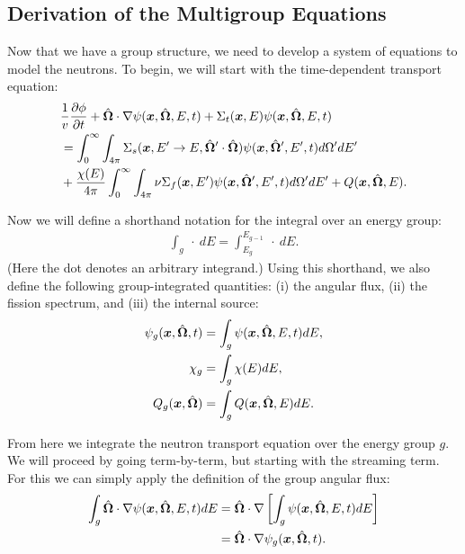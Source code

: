 \subsection{Derivation of the Multigroup Equations} \label{Sec:neutronics_multigroupEquationsDerivation}

Now that we have a group structure, we need to develop a system of equations to model the neutrons. To begin, we will start with the time-dependent transport equation:
\begin{align}
  &\frac{1}{v} \frac{ \partial {\phi} }{ \partial {t} } + \hat{\mathbf{\Omega}} \cdot \nabla\psi(\bm{x},\hat{\mathbf{\Omega}},E,t) + \Sigma_t(\bm{x},E) \psi(\bm{x},\hat{\mathbf{\Omega}},E,t) \nonumber \\*
  &= \int_0^\infty \int_{4\pi} \Sigma_s( \bm{x}, E' \rightarrow E, \hat{\mathbf{\Omega}}' \cdot \hat{\mathbf{\Omega}} ) \psi( \bm{x}, \hat{\mathbf{\Omega}}', E',t ) d\Omega' dE' \nonumber \\*
  &+ \frac{\chi(E)}{4\pi} \int_0^\infty \int_{4\pi} \nu \Sigma_f( \bm{x}, E') \psi( \bm{x}, \hat{\mathbf{\Omega}}', E',t ) d\Omega' dE' + Q(\bm{x},\hat{\mathbf{\Omega}},E).
\end{align}

Now we will define a shorthand notation for the integral over an energy group:
\begin{align}
  \int_g \ \cdot \ dE = \int_{E_g}^{E_{g-1}} \ \cdot \ dE .
\end{align}
(Here the dot denotes an arbitrary integrand.) Using this shorthand, we also define the following group-integrated quantities: (i) the angular flux, (ii) the fission spectrum, and (iii) the internal source:
\begin{subequations}
\begin{align}
  \psi_g(\bm{x},\hat{\mathbf{\Omega}},t) &= \int_g \psi(\bm{x},\hat{\mathbf{\Omega}},E,t) dE, \\
  \chi_g &= \int_g \chi(E) dE, \\
  Q_g(\bm{x},\hat{\mathbf{\Omega}}) &= \int_g Q(\bm{x},\hat{\mathbf{\Omega}},E) dE .
\end{align}
\end{subequations}

From here we integrate the neutron transport equation over the energy group $g$. We will proceed by going term-by-term, but starting with the streaming term. For this we can simply apply the definition of the group angular flux:
\begin{align}
  \int_g \hat{\mathbf{\Omega}} \cdot \nabla \psi(\bm{x},\hat{\mathbf{\Omega}},E,t) dE &= \hat{\mathbf{\Omega}} \cdot \nabla \left[ \int_g  \psi(\bm{x},\hat{\mathbf{\Omega}},E,t) dE \right] \nonumber \\
  &= \hat{\mathbf{\Omega}} \cdot \nabla\psi_g(\bm{x},\hat{\mathbf{\Omega}},t) .
\end{align}

